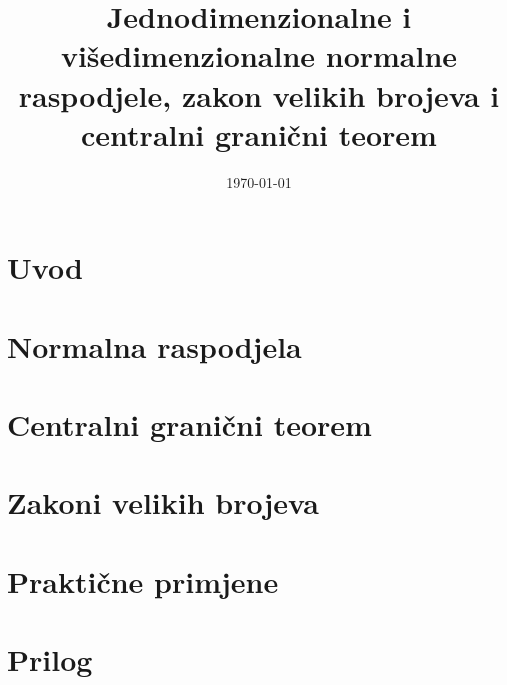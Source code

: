 \documentclass[11pt]{article}
\date{\today}
\title{Jednodimenzionalne i višedimenzionalne normalne raspodjele, zakon velikih
brojeva i centralni granični teorem}
\begin{document}
\maketitle
\newpage
\tableofcontents
\newpage
{}

\section{Uvod}


\section{Normalna raspodjela}


\section{Centralni granični teorem}


\section{Zakoni velikih brojeva}


\section{Praktične primjene}

\section{Prilog}

\end{document}
